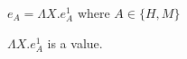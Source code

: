 \begin{case}
$e_{A}=\Lambda X.e_{A}^{1}$ where $A\in\lbrace H,M\rbrace$

$\Lambda X.e_{A}^{1}$ is a value.
\end{case}